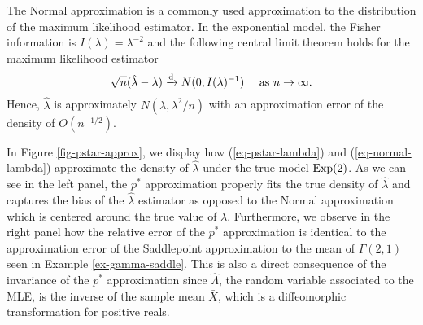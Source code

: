 \begin{example}
    The Normal approximation is a commonly used approximation to the distribution of the maximum likelihood estimator. In the exponential model, the Fisher information is $I(\lambda) = \lambda^{-2}$ and the following central limit theorem holds for the maximum likelihood estimator \cite[Example 3.12]{lehmann2006theory}
    \begin{equation} \label{eq-normal-lambda}
        \sqrt{n}(\hat\lambda - \lambda) \xrightarrow[]{\text{d}} N(0, I(\lambda)^{-1})\ \ \ \  {\textrm{as }} n \rightarrow \infty.
    \end{equation}
    Hence, $\hat\lambda$ is approximately $N(\lambda, \lambda^2/n)$ with an approximation error of the density of $O(n^{-1/2})$. 
    
    In Figure \ref{fig-pstar-approx}, we display how (\ref{eq-pstar-lambda}) and (\ref{eq-normal-lambda}) approximate the density of $\hat\lambda$ under the true model ${\textrm{Exp}}(2)$. As we can see in the left panel, the $p^*$ approximation properly fits the true density of $\hat\lambda$ and captures the bias of the $\hat\lambda$ estimator as opposed to the Normal approximation which is centered around the true value of $\lambda$. Furthermore, we observe in the right panel how the relative error of the $p^*$ approximation is identical to the approximation error of the Saddlepoint approximation to the mean of $\Gamma(2, 1)$ seen in Example \ref{ex-gamma-saddle}. This is also a direct consequence of the invariance of the $p^*$ approximation since $\hat\Lambda$, the random variable associated to the MLE, is the inverse of the sample mean $\bar X$, which is a diffeomorphic transformation for positive reals.
    

    

\end{example}
